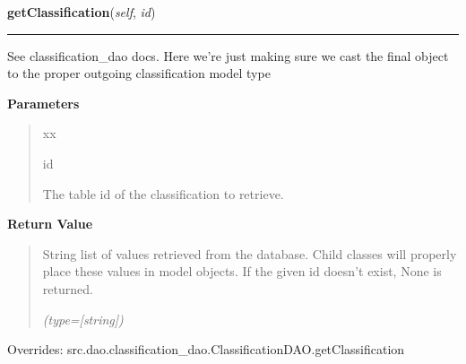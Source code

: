     \vspace{0.5ex}

\hspace{.8\funcindent}\begin{boxedminipage}{\funcwidth}

    \raggedright \textbf{getClassification}(\textit{self}, \textit{id})

    \vspace{-1.5ex}

    \rule{\textwidth}{0.5\fboxrule}
\setlength{\parskip}{2ex}
    See classification\_dao docs. Here we're just making sure we cast the 
    final object to the proper outgoing classification model type

\setlength{\parskip}{1ex}
      \textbf{Parameters}
      \vspace{-1ex}

      \begin{quote}
        \begin{Ventry}{xx}

          \item[id]

          The table id of the classification to retrieve.

        \end{Ventry}

      \end{quote}

      \textbf{Return Value}
    \vspace{-1ex}

      \begin{quote}
      String list of values retrieved from the database. Child classes will
      properly place these values in model objects. If the given id doesn't
      exist, None is returned.

      {\it (type=[string])}

      \end{quote}

      Overrides: src.dao.classification\_dao.ClassificationDAO.getClassification

    \end{boxedminipage}

    \vspace{0.5ex}

